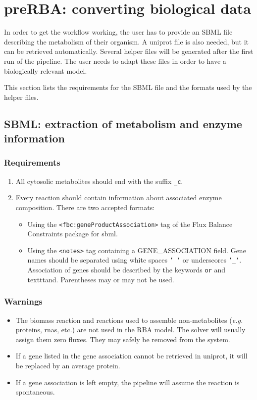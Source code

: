 
\section{preRBA: converting biological data}

In order to get the workflow working, the user has to provide an SBML file describing the metabolism of their organism. A uniprot file is also needed, but it can be retrieved automatically. Several helper files will be generated after the first run of the pipeline. The user needs to adapt these files in order to have a biologically relevant model.

This section lists the requirements for the SBML file and the formats used by the helper files.

\subsection{SBML: extraction of metabolism and enzyme information}

\subsubsection{Requirements}
\begin{enumerate}
\item All cytosolic metabolites should end with the suffix \texttt{\_c}.
\item Every reaction should contain information about associated enzyme composition. There are two accepted formats:
  \begin{itemize}
  \item Using the \texttt{<fbc:geneProductAssociation>} tag of the Flux Balance Constraints package for sbml.
  \item Using the \texttt{<notes>} tag containing a GENE\_ASSOCIATION field. Gene names should be separated using white spaces \texttt{' '} or underscores \texttt{'\_'}. Association of genes should be described by the keywords \texttt{or} and texttt{and}. Parentheses may or may not be used.
  \end{itemize}
\end{enumerate}

\subsubsection{Warnings}
\begin{itemize}
\item The biomass reaction and reactions used to assemble non-metabolites (\textit{e.g.} proteins, rnas, etc.) are not used in the RBA model. The solver will usually assign them zero fluxes. They may safely be removed from the system.
\item If a gene listed in the gene association cannot be retrieved in uniprot, it will be replaced by an average protein.
\item If a gene association is left empty, the pipeline will assume the reaction is spontaneous.
\end{itemize}
   
